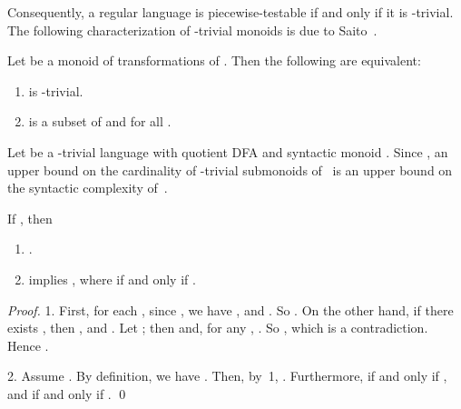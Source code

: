 \documentclass{llncs}
\newcommand{\be}{\begin{enumerate}}
\newcommand{\ee}{\end{enumerate}}
\begin{document}
Consequently, a regular language is piecewise-testable if and only if it is -trivial. The following characterization of -trivial monoids is due to Saito~\cite{Sai98}. 

\begin{theorem}[Saito]\label{thm:saito}
Let  be a monoid of transformations of . Then the following are equivalent:
\be
\item 
 is -trivial.
\item 
 is a subset of  and  for all . 
\ee
\end{theorem}


\vspace{12pt}
Let  be a  -trivial language with quotient DFA  and syntactic monoid . Since , an upper bound on the cardinality of -trivial submonoids of~ is an upper bound on the syntactic complexity of~. 

\begin{lemma}\label{lem:fixmax} 
If , then
\be
\item 
.
\item 
 implies , where  if and only if .
\ee 
\end{lemma}

\begin{proof} 
1. First, for each , since , we have , and . So . On the other hand, if there exists , then , and . Let ; then  and, for any , . So , which is a contradiction. Hence . 

2. Assume . By definition, we have . Then, by~1, . Furthermore,  if and only if , and if and only if . \qed
\end{proof}
\end{document}
